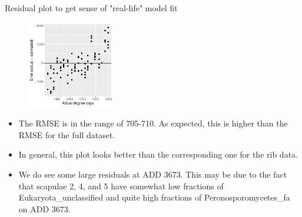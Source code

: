 \documentclass{beamer}
\begin{document}
\begin{frame}{Residual plot to get sense of "real-life" model fit}

  \begin{center}
    \begin{figure}
      \includegraphics[width=1.5in]{w_scapulae/leave_out_one_scapula_and_one_day_residuals}
    \end{figure}
  \end{center}
  
  \vspace{0.1in}

  {\scriptsize
    \begin{itemize}
    \item The RMSE is in the range of 705-710.  As expected, this is
      higher than the RMSE for the full dataset.
    \item In general, this plot looks better than the corresponding one for the
    rib data.
    \item We do see some large residuals at ADD 3673.  This may be due to the
    fact that scapulae 2, 4, and 5 have somewhat low fractions of
    Eukaryota\_unclassified and quite high fractions of Peronosporomycetes\_fa
    on ADD 3673. 
    \end{itemize}
  }

\end{frame}
\end{document}

